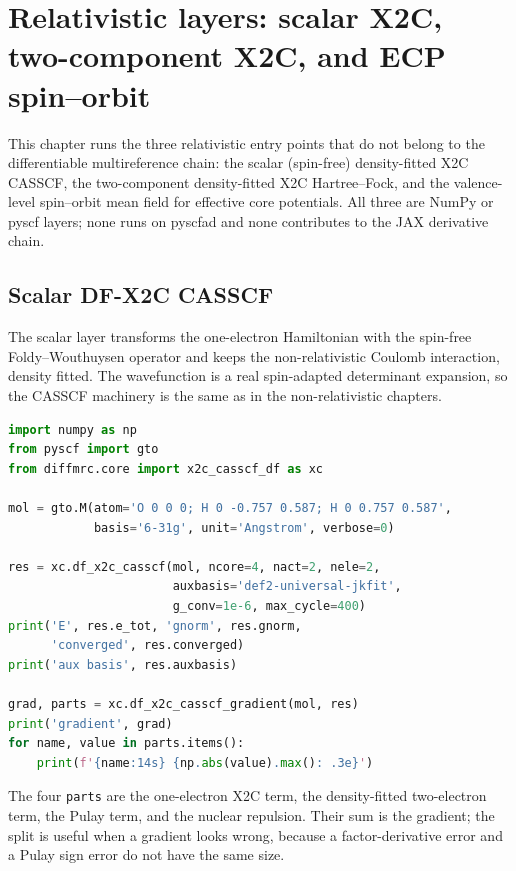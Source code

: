 \section{Relativistic layers: scalar X2C, two-component X2C, and ECP spin--orbit}
\label{sec:relativistic-tutorial}

This chapter runs the three relativistic entry points that do not
belong to the differentiable multireference chain: the scalar
(spin-free) density-fitted X2C CASSCF, the two-component density-fitted
X2C Hartree--Fock, and the valence-level spin--orbit mean field for
effective core potentials.  All three are NumPy or pyscf layers; none
runs on pyscfad and none contributes to the JAX derivative chain.

\subsection{Scalar DF-X2C CASSCF}

The scalar layer transforms the one-electron Hamiltonian with the
spin-free Foldy--Wouthuysen operator and keeps the non-relativistic
Coulomb interaction, density fitted.  The wavefunction is a real
spin-adapted determinant expansion, so the CASSCF machinery is the same
as in the non-relativistic chapters.

\begin{lstlisting}[language=Python]
import numpy as np
from pyscf import gto
from diffmrc.core import x2c_casscf_df as xc

mol = gto.M(atom='O 0 0 0; H 0 -0.757 0.587; H 0 0.757 0.587',
            basis='6-31g', unit='Angstrom', verbose=0)

res = xc.df_x2c_casscf(mol, ncore=4, nact=2, nele=2,
                       auxbasis='def2-universal-jkfit',
                       g_conv=1e-6, max_cycle=400)
print('E', res.e_tot, 'gnorm', res.gnorm,
      'converged', res.converged)
print('aux basis', res.auxbasis)

grad, parts = xc.df_x2c_casscf_gradient(mol, res)
print('gradient', grad)
for name, value in parts.items():
    print(f'{name:14s} {np.abs(value).max(): .3e}')
\end{lstlisting}

The four \texttt{parts} are the one-electron X2C term, the
density-fitted two-electron term, the Pulay term, and the nuclear
repulsion.  Their sum is the gradient; the split is useful when a
gradient looks wrong, because a factor-derivative error and a Pulay
sign error do not have the same size.

